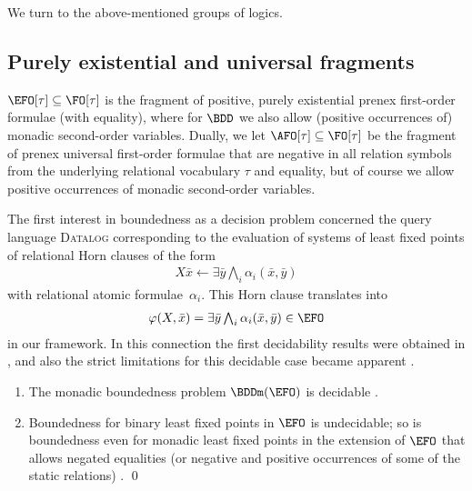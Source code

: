 \documentclass{LMCS}
\begin{document}
\medskip
We turn to the above-mentioned groups of logics.

\subsection{Purely existential and universal fragments}
\label{subsec:existforall}

$\EFO[\tau] \subseteq \FO[\tau]$ is the fragment of positive,
purely existential prenex first-order formulae (with equality), where
for $\BDD$ we also allow (positive occurrences of)
monadic second-order variables.
Dually, we let $\AFO[\tau] \subseteq \FO[\tau]$
be the fragment of prenex universal
first-order formulae that are negative in all
relation symbols from the underlying relational vocabulary
$\tau$ and equality, but of course we allow positive occurrences
of monadic second-order variables.

The first interest in boundedness as a decision problem
concerned the query language \textsc{Datalog}
corresponding to the evaluation of systems of least fixed
points of relational Horn clauses of the form
\begin{align*}
  \textstyle
  X\bar x \leftarrow \exists\bar y \bigwedge_i \alpha_i(\bar x,\bar y)
\end{align*}
with relational atomic formulae~$\alpha_i$.
This Horn clause translates into
\begin{align*}
  \textstyle
  \varphi(X,\bar x) = \exists\bar y \bigwedge_i \alpha_i(\bar x,\bar y) \in \EFO
\end{align*}
in our framework. In this connection
the first decidability results were obtained in
\cite{CosmadakisGaKaVa88}, and also the strict limitations for this
decidable case became apparent \cite{GaifmanMaSaVa93,HillebrandEtAl95}.

\begin{thm}\hfill
\begin{enumerate}[label=\({\alph*}]
\item The monadic boundedness problem $\BDDm(\EFO)$ is decidable \textup{\cite{CosmadakisGaKaVa88}.}
\item Boundedness for binary least fixed points in $\EFO$
  is undecidable\?; so is boundedness even for monadic least fixed points
  in the extension of\/ $\EFO$ that allows
  negated equalities (or negative and positive
  occurrences of some of the static relations)
  \textup{\cite{GaifmanMaSaVa93,HillebrandEtAl95}.}
\qed\end{enumerate}
\end{thm}
\end{document}
